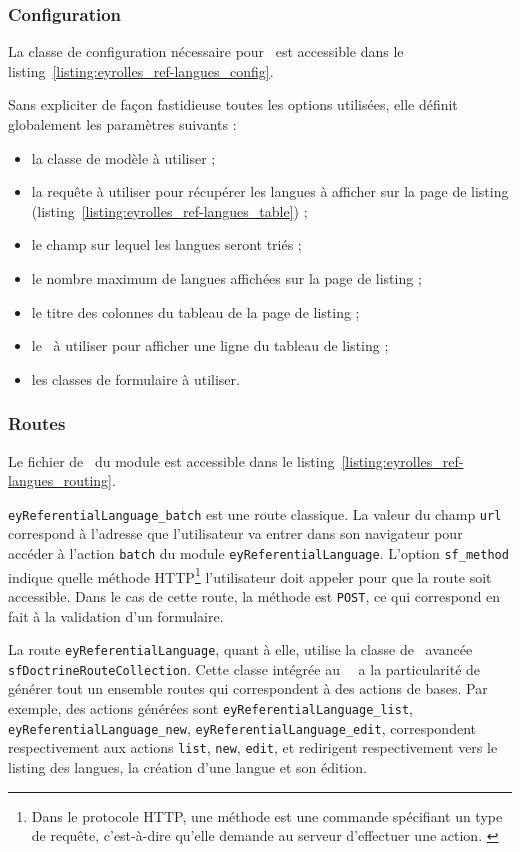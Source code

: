 \subsubsection{Configuration}

La classe de configuration nécessaire pour \asladmin\ est accessible dans le listing~\ref{listing:eyrolles_ref-langues_config}.

Sans expliciter de façon fastidieuse toutes les options utilisées, elle définit globalement les paramètres suivants :

\begin{itemize}
	\item la classe de modèle à utiliser ;
	\item la requête à utiliser pour récupérer les langues à afficher sur la page de listing (listing~\ref{listing:eyrolles_ref-langues_table}) ;
	\item le champ sur lequel les langues seront triés ;
	\item le nombre maximum de langues affichées sur la page de listing ;
	\item le titre des colonnes du tableau de la page de listing ;
	\item le \apartial\ à utiliser pour afficher une ligne du tableau de listing ;
	\item les classes de formulaire à utiliser.
\end{itemize}


\subsubsection{Routes}

Le fichier de \arouting\ du module est accessible dans le listing~\ref{listing:eyrolles_ref-langues_routing}.

\texttt{eyReferentialLanguage\_batch} est une route classique. La valeur du champ \texttt{url} correspond à l'adresse que l'utilisateur va entrer dans son navigateur pour accéder à l'action \texttt{batch} du module \texttt{eyReferentialLanguage}. L'option \texttt{sf\_method} indique quelle méthode HTTP\footnote{Dans le protocole HTTP, une méthode est une commande spécifiant un type de requête, c'est-à-dire qu'elle demande au serveur d'effectuer une action. \cite{http}} l'utilisateur doit appeler pour que la route soit accessible. Dans le cas de cette route, la méthode est \texttt{POST}, ce qui correspond en fait à la validation d'un formulaire.

La route \texttt{eyReferentialLanguage}, quant à elle, utilise la classe de \arouting\ avancée \texttt{sfDoctrineRouteCollection}. Cette classe intégrée au \afm\ \asf\ a la particularité de générer tout un ensemble routes qui correspondent à des actions de bases. Par exemple, des actions générées sont \texttt{ey\-Re\-fe\-ren\-tial\-Lan\-guage\_\-list}, \texttt{ey\-Re\-fe\-ren\-tial\-Lan\-guage\_\-new}, \texttt{ey\-Re\-fe\-ren\-tial\-Lan\-guage\_\-edit}, correspondent respectivement aux actions \texttt{list}, \texttt{new}, \texttt{edit}, et redirigent respectivement vers le listing des langues, la création d'une langue et son édition.


